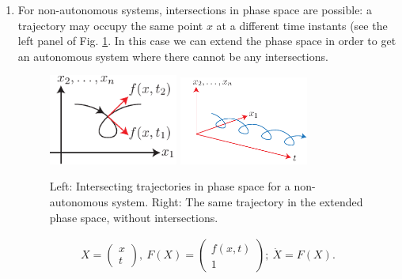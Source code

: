 \begin{enumerate}
	\item For non-autonomous systems, intersections in phase space are possible: a trajectory may occupy the same point $x$ at a different time instants (see the left panel of Fig. \ref{fig:automization}. In this case we can extend the phase space in order to get an autonomous system where there cannot be any intersections.
		\begin{figure}[h!]
			\centering
			\includegraphics[width=0.4\textwidth]{figures/ch1/4intersecting_trajectories.pdf}
			\hspace{0.05\textwidth}
			\includegraphics[width=0.4\textwidth]{figures/ch1/5extended_space.pdf}
			\caption{Left: Intersecting trajectories in phase space for a non-autonomous system. Right: The same trajectory in the extended phase space, without intersections.}
			\label{fig:automization}
		\end{figure}
		\begin{align}
			 {X} = 
			\begin{pmatrix}
				 {x} \\ t
			\end{pmatrix},\
			F( {X}) = 
			\begin{pmatrix}
				f( {x},t) \\ 1
			\end{pmatrix};\
			\dot{ {X}} = F( {X}).
		\end{align}
\end{enumerate}

